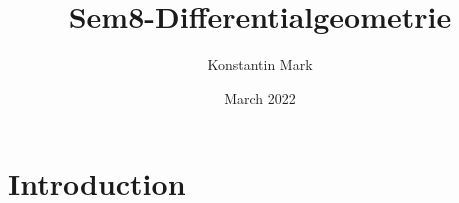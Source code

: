 \documentclass{article}
\title{Sem8-Differentialgeometrie}
\author{Konstantin Mark}
\date{March 2022}
\begin{document}
\maketitle

\section{Introduction}
\end{document}
